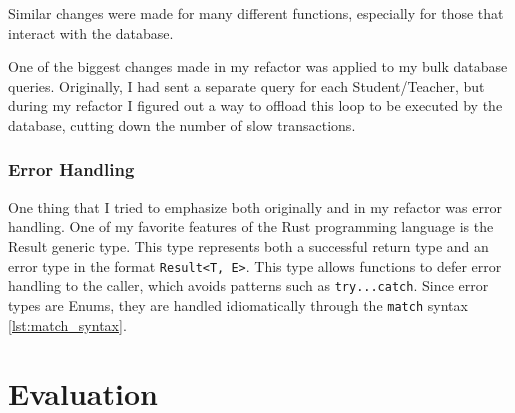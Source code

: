 \documentclass{paper}
\begin{document}




Similar changes were made for many different functions, especially for those that interact with the database.

One of the biggest changes made in my refactor was applied to my bulk database queries.
Originally, I had sent a separate query for each Student/Teacher, but during my refactor I figured out a way to offload this loop to be executed by the database, cutting down the number of slow transactions.

\subsubsection{Error Handling}
One thing that I tried to emphasize both originally and in my refactor was error handling.
One of my favorite features of the Rust programming language is the Result generic type.
This type represents both a successful return type and an error type in the format \texttt{Result<T, E>}.
This type allows functions to defer error handling to the caller, which avoids patterns such as \texttt{try...catch}.
Since error types are Enums, they are handled idiomatically through the \texttt{match} syntax \cref{lst:match_syntax}.



\section{Evaluation}
\label{sec:eval}

\label{mylastpage}
\newpage
\pagestyle{frontorback}

\newpage
\listoffigures
\vspace{1cm}
\listofsnippets
\vspace{1cm}
{}
\printbibliography
\thispagestyle{frontorback}
\end{document}
